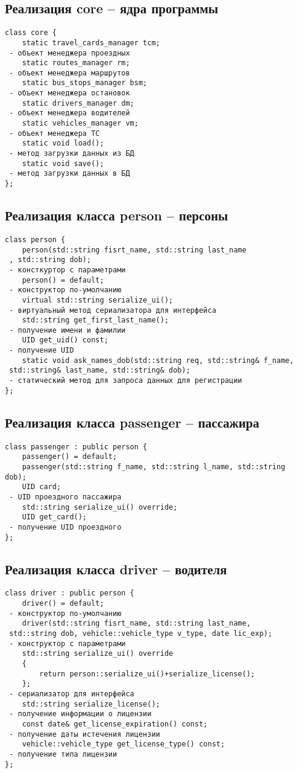 \subsection{Реализация core -- ядра программы}
\begin{verbatim}
class core {
	static travel_cards_manager tcm;
 - объект менеджера проездных
	static routes_manager rm; 
 - объект менеджера маршрутов
	static bus_stops_manager bsm;
 - объект менеджера остановок
	static drivers_manager dm;
 - объект менеджера водителей
	static vehicles_manager vm;
 - объект менеджера ТС
	static void load();
 - метод загрузки данных из БД
	static void save();
 - метод загрузки данных в БД
};
\end{verbatim}

\subsection{Реализация класса person -- персоны}
\begin{verbatim}
class person {
	person(std::string fisrt_name, std::string last_name
 , std::string dob);
 - консткуртор с параметрами
	person() = default;
 - конструктор по-умолчанию
	virtual std::string serialize_ui();
 - виртуальный метод сериализатора для интерфейса 
	std::string get_first_last_name();
 - получение имени и фамилии
	UID get_uid() const;
 - получение UID
	static void ask_names_dob(std::string req, std::string& f_name,
 std::string& last_name, std::string& dob);
 - статический метод для запроса данных для регистрации
};
\end{verbatim}

\subsection{Реализация класса passenger -- пассажира}
\begin{verbatim}
class passenger : public person {
	passenger() = default;
	passenger(std::string f_name, std::string l_name, std::string dob);
	UID card;
 - UID проездного пассажира
	std::string serialize_ui() override;
	UID get_card();
 - получение UID проездного
};
\end{verbatim}

\subsection{Реализация класса driver -- водителя}
\begin{verbatim}
class driver : public person {
	driver() = default;
 - конструктор по-умолчанию
	driver(std::string fisrt_name, std::string last_name, 
 std::string dob, vehicle::vehicle_type v_type, date lic_exp);
 - конструктор с параметрами
	std::string serialize_ui() override
	{
		return person::serialize_ui()+serialize_license();
	};
 - сериализатор для интерфейса
	std::string serialize_license();
 - получение информации о лицензии
	const date& get_license_expiration() const;
 - получение даты истечения лицензии
	vehicle::vehicle_type get_license_type() const;
 - получение типа лицензии
};
\end{verbatim}

